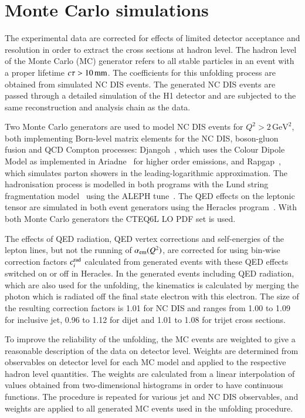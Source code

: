 \documentclass[12pt]{article}
\begin{document}
\section{Monte Carlo simulations}
\label{sect:mc_simulation}
The experimental data are corrected for effects of limited detector
acceptance and resolution in order to extract the cross sections at hadron level.
The hadron level of the Monte Carlo (MC) generator refers to all stable particles in an event
with a proper lifetime $c\tau>10\,{\rm mm}$.
The coefficients for this unfolding process are obtained from simulated NC DIS events. 
The generated NC DIS events are passed through a detailed simulation of the H1 detector and are subjected 
to the same reconstruction and analysis chain as the data.

Two Monte Carlo generators are used to model NC DIS events for $Q^2>2\,\text{GeV}^2$, both 
implementing Born-level matrix elements for the NC DIS, boson-gluon fusion and QCD Compton processes:
Djangoh~\cite{DJANGO}, which uses the Colour Dipole Model as 
implemented in Ariadne~\cite{ARIADNE} for higher order emissions, and Rapgap~\cite{RAPGAP},
which simulates parton showers in the leading-logarithmic approximation.
The hadronisation process is modelled in both programs with the Lund string fragmentation model~\cite{lundstring,lundstring2} using the ALEPH tune~\cite{alephtune}.
The QED effects on the leptonic tensor are simulated in both event generators
using the Heracles program~\cite{HERACLES}. 
With both Monte Carlo generators the CTEQ6L LO PDF set
\cite{Pumplin:2002vw} is used.

The effects of QED radiation, QED vertex corrections and self-energies of the
lepton lines, but not the running of $\aem(Q^2)$, are corrected for using bin-wise correction factors $c_i^{\rm rad}$ calculated
from generated events with these QED effects switched on or  off in Heracles.
In the generated events including QED radiation, which are also used for the unfolding,
the kinematics is calculated by merging the photon which is radiated off the final state electron with this electron.
The size of the resulting correction factors is 1.01 for NC DIS and ranges from 1.00 to 1.09 for inclusive jet,
0.96 to 1.12 for dijet and 1.01 to 1.08 for trijet cross sections.

To improve the reliability of the unfolding, the MC events are weighted to 
give a reasonable description of the data on detector level.
Weights are determined from observables on detector level for each MC model and 
applied to the respective hadron level quantities.
The weights are calculated from a linear interpolation of values obtained from two-dimensional histograms in order to have continuous functions.
The procedure is repeated for various jet and NC DIS observables, and weights are applied to all generated MC events used in the unfolding procedure.
\end{document}
